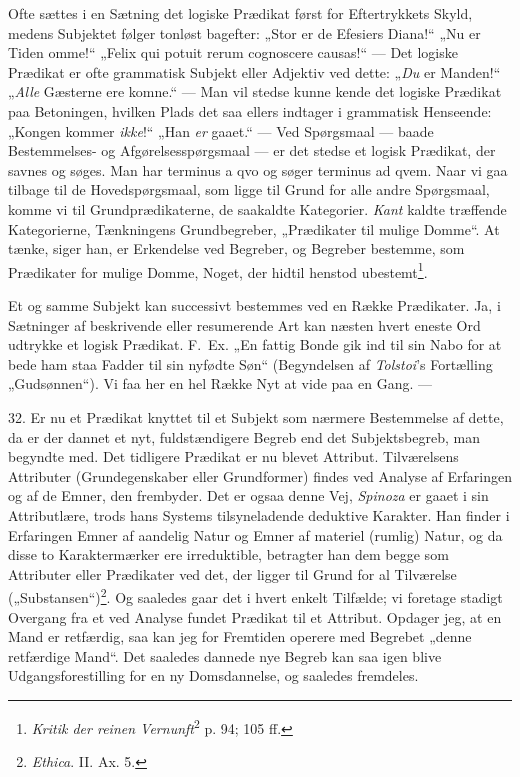 \documentclass[12pt,a4paper]{book}
\newcommand{\apage}[1]{\marginnote{\footnotesize\textit{[#1]}}}
\begin{document}
Ofte sættes i en Sætning det logiske Prædikat først for Eftertrykkets
Skyld, medens Subjektet følger tonløst bagefter: „Stor er de Efesiers
Diana!“ „Nu er Tiden omme!“ „Felix qui potuit rerum cognoscere causas!“
--- Det logiske Prædikat er ofte grammatisk Subjekt eller Adjektiv ved
dette: „\emph{Du} er Manden!“ „\emph{Alle} Gæsterne ere komne.“ --- Man
vil stedse kunne kende det logiske Prædikat paa Betoningen, hvilken
Plads det saa ellers indtager i grammatisk Henseende: „Kongen kommer
\emph{ikke}!“ „Han \emph{er} gaaet.“ --- Ved Spørgsmaal --- baade
Bestemmelses- og Afgørelsesspørgsmaal --- er det stedse et logisk
Prædikat, der savnes og søges. Man har terminus a qvo og søger terminus
ad qvem. Naar vi gaa tilbage til de Hovedspørgsmaal, som ligge til Grund
for alle andre Spørgsmaal, komme vi til Grundprædikaterne, de saakaldte
Kategorier. \emph{Kant} kaldte træffende Kategorierne, Tænkningens
Grundbegreber, „Prædikater til mulige Domme“. At tænke, siger han, er
Erkendelse ved Begreber, og Begreber bestemme, som Prædikater for mulige
Domme, Noget, der hidtil henstod ubestemt\footnote{\emph{Kritik der
reinen Vernunft}\textsuperscript{2} p. 94; 105 ff.}.

Et og samme Subjekt kan successivt bestemmes ved en Række Prædikater.
Ja, i Sætninger af beskrivende eller resumerende Art kan næsten hvert
eneste Ord udtrykke et logisk Prædikat. F.\ Ex. „En fattig Bonde gik ind
til sin Nabo for at bede ham staa Fadder til sin nyfødte Søn“
(Begyndelsen af \emph{Tolstoi}’s Fortælling „Gudsønnen“). Vi faa her en
hel Række Nyt at vide paa en Gang. ---

32. Er nu et Prædikat knyttet til et Subjekt som nærmere \apage{89} Bestemmelse af
dette, da er der dannet et nyt, fuldstændigere Begreb end det
Subjektsbegreb, man begyndte med. Det tidligere Prædikat er nu blevet
Attribut. Tilværelsens Attributer (Grundegenskaber eller Grundformer)
findes ved Analyse af Erfaringen og af de Emner, den frembyder. Det er
ogsaa denne Vej, \emph{Spinoza} er gaaet i sin Attributlære, trods hans
Systems tilsyneladende deduktive Karakter. Han finder i Erfaringen Emner
af aandelig Natur og Emner af materiel (rumlig) Natur, og da disse to
Karaktermærker ere irreduktible, betragter han dem begge som Attributer
eller Prædikater ved det, der ligger til Grund for al Tilværelse
(„Substansen“)\footnote{\emph{Ethica}. II. Ax. 5.}. Og saaledes gaar det
i hvert enkelt Tilfælde; vi foretage stadigt Overgang fra et ved Analyse
fundet Prædikat til et Attribut. Opdager jeg, at en Mand er retfærdig,
saa kan jeg for Fremtiden operere med Begrebet „denne retfærdige Mand“.
Det saaledes dannede nye Begreb kan saa igen blive Udgangsforestilling
for en ny Domsdannelse, og saaledes fremdeles.
\end{document}
